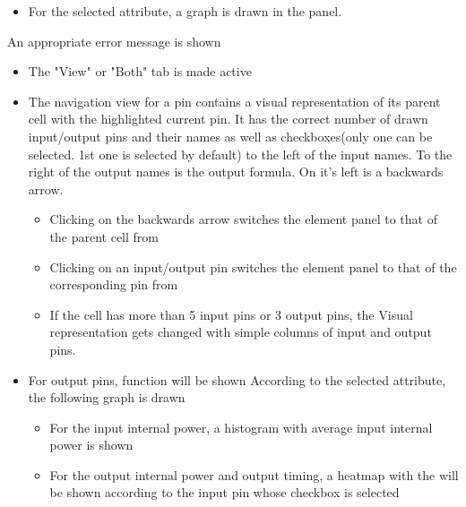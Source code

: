 \documentclass[10pt,a4paper]{report}
\begin{document}
\begin{FR}
{\begin{itemize}
\begin{itemize}
                \item For internal power: fall-power and rise-power
                \item For timing: timing-sense, timing-type and then cell-fall, cell-rise, fall-transition, rise-transition
            \end{itemize}
            \item For the selected attribute, a graph is drawn in the panel.
        \end{itemize}}
    {An appropriate error message is shown}
    {\begin{itemize}
        \item The "View" or "Both" tab is made active
    \end{itemize}}
    {\begin{itemize}
        \item The navigation view for a pin contains a visual representation of its parent cell with the highlighted current pin. It has the correct number of drawn input/output pins and their names as well as checkboxes(only one can be selected. 1st one is selected by default) to the left of the input names. To the right of the output names is the output formula. On it's left is a backwards arrow.
        \begin{itemize}
            \item Clicking on the backwards arrow switches the element panel to that of the parent cell from \label{FR-BLABLABLA}
            \item Clicking on an input/output pin switches the element panel to that of the corresponding pin from \label{FR-BLABLABLA}
            \item If the cell has more than 5 input pins or 3 output pins, the Visual representation gets changed with simple columns of input and output pins.
        \end{itemize}
        \item For output pins, function will be shown
        According to the selected attribute, the following graph is drawn
        \begin{itemize}
            \item For the input internal power, a histogram with average input internal power is shown
            \item For the output internal power and output timing, a heatmap with the will be shown according to the input pin whose checkbox is selected
        \end{itemize}
    \end{itemize}}

\end{FR}
\end{document}
